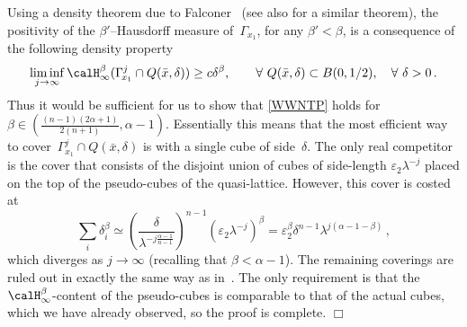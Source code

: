 \documentclass[biblatex]{pzorin-note}
\begin{document}
Using a density theorem due to Falconer~\cite{Falconer1} (see also \cite[Proposition 8.5]{Falconer2} for a similar theorem),
the positivity of the $\beta'$--Hausdorff measure of~$\Gamma_{\!x_1}$, for any $\beta' < \beta$, is a
consequence of the following density property
\begin{equation}\label{WWNTP}
\liminf_{j \to \infty} \calH^{\beta}_{\infty} ( \Gamma^j_{\!x_1} \cap Q(\bar{x}, \delta) ) \geq c\delta^{\beta} ,
\qquad
\forall\ Q(\bar{x}, \delta)\subset B(0,1/2),
\quad
\forall\ \delta >0 \, .
\end{equation}
Thus it would be sufficient for us to show that \eqref{WWNTP} holds for~$\beta \in ( \frac{(n-1)(2\alpha +1)}{2(n+1)}, \alpha-1 )$.
Essentially this means that the most efficient way to cover~$\Gamma^j_{\!x_1} \cap Q(\bar{x}, \delta)$ is with
a single cube of side~$\delta$.
The only real competitor is the cover
that consists of the disjoint union of cubes of side-length $\varepsilon_{2} \lambda^{-j}$ placed on the
top of the pseudo-cubes of the quasi-lattice. However, this cover is costed at
\[
\sum_{i} \delta_i^\beta \simeq \left( \frac{\delta}{ \lambda^{-j\frac{\alpha-1}{n-1}}} \right)^{\!\!n-1} \!\!\! (\varepsilon_{2} \lambda^{-j})^\beta
=\varepsilon_{2}^{\beta}\delta^{n-1} \lambda^{j(\alpha-1-\beta)} \, ,
\]
which diverges as $j\to\infty$ (recalling that $\beta < \alpha-1$).
The remaining coverings are ruled out in exactly the same way as in~\cite[Section 4]{LuR2}.
The only requirement is that the $\calH^{\beta}_{\infty}$-content of the pseudo-cubes is comparable to that
of the actual cubes, which we have already observed, so the proof is complete.
\hfill $\Box$
%
%
\end{document}
